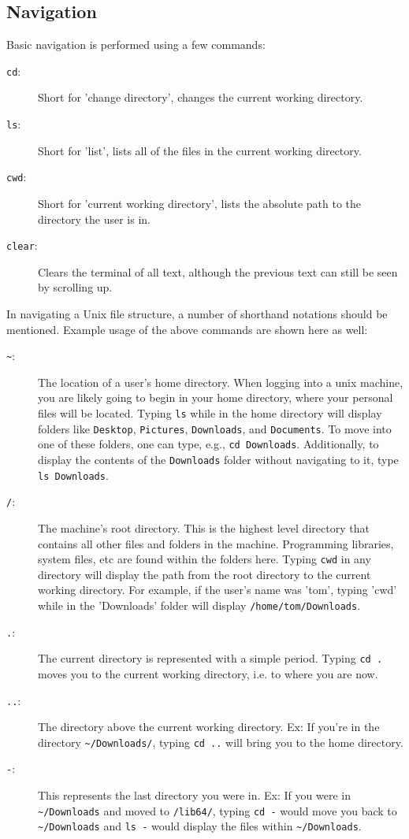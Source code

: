 \documentclass[12pt,a4paper]{article}
\begin{document}
\subsection*{Navigation}
Basic navigation is performed using a few commands:
\begin{description}
    \item[\texttt{cd}:] Short for 'change directory', changes the current working directory.
    \item[\texttt{ls}:] Short for 'list', lists all of the files in the current working directory.
    \item[\texttt{cwd}:] Short for 'current working directory', lists the absolute path to the directory the user is in.
    \item[\texttt{clear}:] Clears the terminal of all text, although the previous text can still be seen by scrolling up.
\end{description}
In navigating a Unix file structure, a number of shorthand notations should be mentioned. Example usage of the above commands are shown here as well:
\begin{description}
    \item[\texttt{\textasciitilde{}}:] The location of a user's home directory. When logging into a unix machine, you are likely going to begin in your home directory, where your personal files will be located. Typing \texttt{ls} while in the home directory will display folders like \texttt{Desktop}, \texttt{Pictures}, \texttt{Downloads}, and \texttt{Documents}. To move into one of these folders, one can type, e.g., \texttt{cd Downloads}. Additionally, to display the contents of the \texttt{Downloads} folder without navigating to it, type \texttt{ls Downloads}.
    \item[\texttt{/}:] The machine's root directory. This is the highest level directory that contains all other files and folders in the machine. Programming libraries, system files, etc are found within the folders here. Typing \texttt{cwd} in any directory will display the path from the root directory to the current working directory. For example, if the user's name was 'tom', typing 'cwd' while in the 'Downloads' folder will display \texttt{/home/tom/Downloads}.
    \item[\texttt{.}:] The current directory is represented with a simple period. Typing \texttt{cd .} moves you to the current working directory, i.e. to where you are now.
    \item[\texttt{..}:] The directory above the current working directory. Ex: If you're in the directory \texttt{\textasciitilde{}/Downloads/}, typing \texttt{cd ..} will bring you to the home directory.
    \item[\texttt{-}:] This represents the last directory you were in. Ex: If you were in \texttt{\textasciitilde{}/Downloads} and moved to \texttt{/lib64/}, typing \texttt{cd -} would move you back to \texttt{\textasciitilde{}/Downloads} and \texttt{ls -} would display the files within \texttt{\textasciitilde{}/Downloads}.
\end{description}
\end{document}
